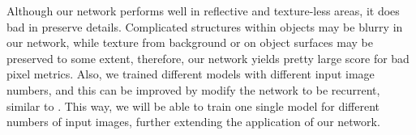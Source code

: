 \documentclass[10pt,twocolumn,letterpaper]{article}
\begin{document}
Although our network performs well in reflective and texture-less areas, it does bad in preserve details. Complicated structures within objects may be blurry in our network, while texture from background or on object surfaces may be preserved to some extent, therefore, our network yields pretty large score for bad pixel metrics. Also, we trained different models with different input image numbers, and this can be improved by modify the network to be recurrent, similar to \cite{choy20163d}. This way, we will be able to train one single model for different numbers of input images, further extending the application of our network.


{\small


}
\end{document}
